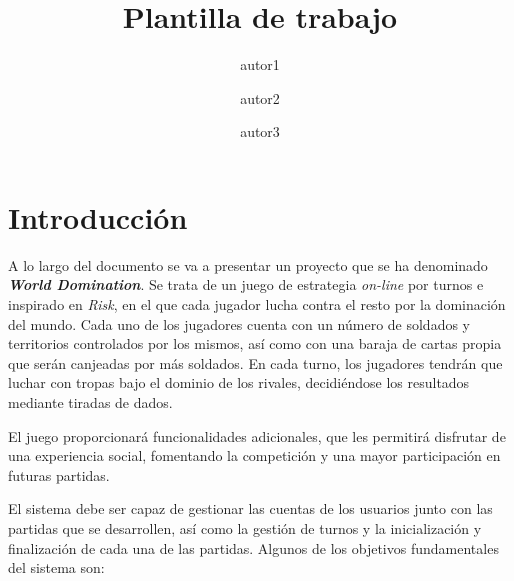 \documentclass[11pt, a4paper, titlepage]{article}
\title{Plantilla de trabajo}
\author{autor1 \and autor2 \and autor3}
\date{\monthyear}
\begin{document}
 


\begin{titlepage}

\thispagestyle{empty}


\end{titlepage}
\newpage





\thispagestyle{empty}
\fontsize{11pt}{11pt}\selectfont

\setcounter{tocdepth}{4}

{
    \hypersetup{linkcolor=black}
    \doublespacing
    \tableofcontents
}

\thispagestyle{empty}

\clearpage
\setcounter{page}{1}
\section{Introducción}
A lo largo del documento se va a presentar un proyecto que se ha denominado\textit{ \textbf{World Domination}}. Se trata de un juego de estrategia \textit{on-line} por turnos e inspirado en \textit{Risk}, en el que cada jugador lucha contra el resto por la dominación del mundo. Cada uno de los jugadores cuenta con un número de soldados y territorios controlados por los mismos, así como con una baraja de cartas propia que serán canjeadas por más soldados. En cada turno, los jugadores tendrán que luchar con tropas bajo el dominio de los rivales, decidiéndose los resultados mediante tiradas de dados. \newline

El juego proporcionará funcionalidades adicionales, que les permitirá disfrutar de una experiencia social, fomentando la competición y una mayor participación en futuras partidas. \newline

El sistema debe ser capaz de gestionar las cuentas de los usuarios junto con las partidas que se desarrollen, así como la gestión de turnos y la inicialización y finalización de cada una de las partidas. Algunos de los objetivos fundamentales del sistema son: 
\end{document}
